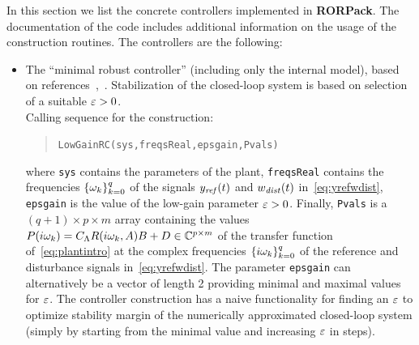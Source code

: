 \documentclass[11pt, a4paper]{amsart}
\newcommand{\CL}{C_\Lambda}
\theoremstyle{definition}
\numberwithin{equation}{section}
\newcommand{\yref}{y_{\mbox{\scriptsize\textit{ref}}}}
\newcommand{\wdist}{w_{\mbox{\scriptsize\textit{dist}}}}
\newcommand{\RORname}{\textbf{RORPack}}
\begin{document}
In this section we list the concrete controllers implemented in \RORname.
The documentation of the code includes additional information on the usage of the construction routines.
The controllers are the following:
\begin{itemize}
  \item The ``minimal robust controller'' (including only the internal model), based on references~\cite{HamPoh00},~. Stabilization of the closed-loop system is based on selection of a suitable  $\varepsilon>0$.\\[1ex]
      Calling sequence for the construction:\\[-1ex]
     \begin{quotation}
       \texttt{LowGainRC(sys,freqsReal,epsgain,Pvals)}
     \end{quotation}
     \medskip
     where \texttt{sys} contains the parameters of the plant, \texttt{freqsReal} contains the frequencies $\{\omega_k\}_{k=0}^q$ of the signals $\yref(t)$ and $\wdist(t)$ in~\eqref{eq:yrefwdist}, \texttt{epsgain} is the value of the low-gain parameter $\varepsilon>0$. Finally, \texttt{Pvals} is a $(q+1)\times p\times m$ array containing the values $P(i\gw_k)=\CL R(i\gw_k,A)B+D\in \C^{p\times m}$ of the transfer function of~\eqref{eq:plantintro} at the complex frequencies $\{i\omega_k\}_{k=0}^q$ of the reference and disturbance signals in~\eqref{eq:yrefwdist}.
     The parameter \texttt{epsgain} can alternatively be a vector of length 2 providing minimal and maximal values for $\varepsilon$. The controller construction has a naive functionality for finding an $\varepsilon$ to optimize stability margin of the numerically approximated closed-loop system (simply by starting from the minimal value and increasing $\varepsilon$ in steps). 

     \bigskip


\end{itemize}
\end{document}
